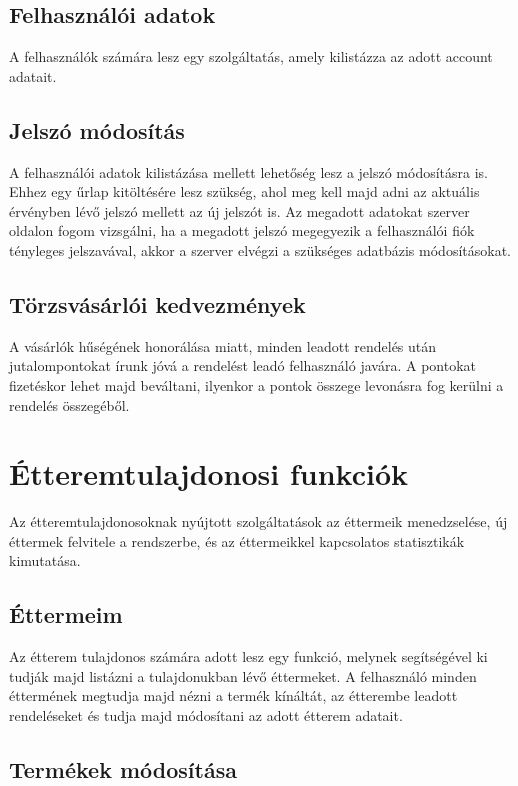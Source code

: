 \subsection{Felhasználói adatok}

A felhasználók számára lesz egy szolgáltatás, amely kilistázza az adott account adatait.

\subsection{Jelszó módosítás}

A felhasználói adatok kilistázása mellett lehetőség lesz a jelszó módosításra is. Ehhez egy űrlap kitöltésére lesz szükség, ahol meg kell majd adni az aktuális érvényben lévő jelszó mellett az új jelszót is. Az megadott adatokat szerver oldalon fogom vizsgálni, ha a megadott jelszó megegyezik a felhasználói fiók tényleges jelszavával, akkor a szerver elvégzi a szükséges adatbázis módosításokat.

\subsection{Törzsvásárlói kedvezmények}

A vásárlók hűségének honorálása miatt, minden leadott rendelés után jutalompontokat írunk jóvá a rendelést leadó felhasználó javára. A pontokat fizetéskor lehet majd beváltani, ilyenkor a pontok összege levonásra fog kerülni a rendelés összegéből.

\section{Étteremtulajdonosi funkciók}

Az étteremtulajdonosoknak nyújtott szolgáltatások az éttermeik menedzselése, új éttermek felvitele a rendszerbe, és az éttermeikkel kapcsolatos statisztikák kimutatása.

\subsection{Éttermeim}

Az étterem tulajdonos számára adott lesz egy funkció, melynek segítségével ki tudják majd listázni a tulajdonukban lévő éttermeket. A felhasználó minden éttermének megtudja majd nézni a termék kínáltát, az étterembe leadott rendeléseket és tudja majd módosítani az adott étterem adatait.

\subsection{Termékek módosítása}


